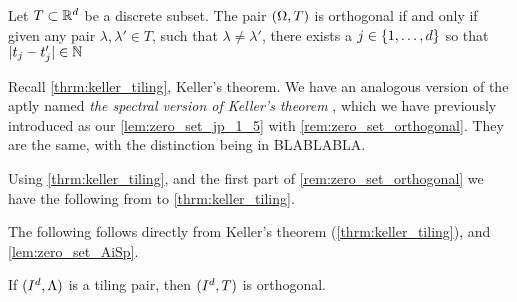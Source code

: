 \documentclass[../thesis.tex]{subfiles}
\begin{document}
  

\begin{lemma}\label{lem:zero_set_AiSp}
    Let $T\subset \mathbb{R}^d$ be a discrete subset. The pair $(\Omega,T)$ is orthogonal if and only if given any pair $\lambda, \lambda' \in T$, such that $\lambda\neq\lambda'$, there exists a $j\in \{1,\dots,d\}$ so that $|t_j -t_j' | \in \mathbb{N}$
\end{lemma}


Recall \cref{thrm:keller_tiling}, Keller's theorem. We have an analogous version of the  aptly named \emph{the spectral version of Keller's theorem} \cite{iosevichSpectralTilingProperties1998}, which we have previously introduced as our \cref{lem:zero_set_jp_1_5} with \cref{rem:zero_set_orthogonal}. They are the same, with the distinction being in BLABLABLA. 


Using \cref{thrm:keller_tiling}, and the first part of \cref{rem:zero_set_orthogonal} we have the following  from to \cref{thrm:keller_tiling}. 


The following  follows directly from Keller's theorem (\cref{thrm:keller_tiling}), and \cref{lem:zero_set_AiSp}.

\begin{corollary}\label{cor:tiling_pair_implies_orthogonal}
    If $(I^d, \Lambda)$ is a tiling pair, then $(I^d,T)$ is orthogonal. %
\end{corollary}
\end{document}
